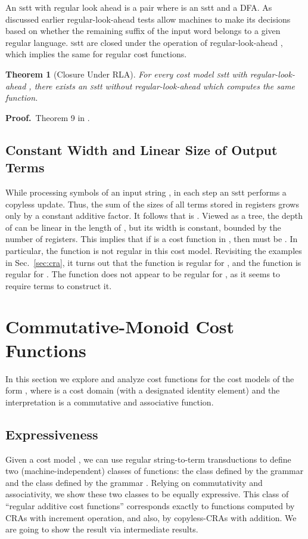 \documentclass[11pt]{article}
\newtheorem{theorem}{Theorem}
\def\Proof{{\bf Proof.}}
\def\qed{{\bf }}
\newcommand{\mypar}[1]{\subsection{#1}}
\def\qed{{\bf }}
\newcommand{\SSTT}{{\sc\textsc sstt}\xspace}
\newcommand{\secref}[1]{Sec.~\ref{sec:#1}\xspace}
\begin{document}
An \SSTT with regular look ahead is a pair  where  is
an \SSTT and  a DFA.  As discussed earlier regular-look-ahead tests
allow machines to make its decisions based on whether the remaining
suffix of the input word belongs to a given regular language.  \SSTT
are closed under the operation of regular-look-ahead
\cite{alur_stt_2011}, which implies the same for regular cost
functions.

\begin{theorem}[Closure Under RLA]\label{thm:stt-rla}
For every cost model \SSTT with regular-look-ahead , there
exists an \SSTT  without regular-look-ahead which computes the
same function.
\end{theorem}
\Proof~Theorem 9 in \cite{alur_stt_2011}.
\qed

\mypar{Constant Width and Linear Size of Output Terms}
While processing symbols of an input string , in each step an \SSTT
performs a copyless update. Thus, the sum of the sizes of all terms
stored in registers grows only by a constant additive factor.  It
follows that  is .  Viewed as a tree, the depth of
 can be linear in the length of , but its width is
constant, bounded by the number of registers.  This implies that if
 is a cost function in , then  must be
. In particular, the function  is not regular in
this cost model.  Revisiting the examples in \secref{cra}, it turns
out that the function  is regular for , and
the function  is regular for .  The
function  does not appear to be
regular for , as it seems to require
 terms to construct it.

\section{Commutative-Monoid Cost Functions}\label{sec:cmcf}
In this section we explore and analyze cost functions for the cost
models of the form , where  is a cost
domain (with a designated identity element) and the interpretation
 is a commutative and associative function.


\mypar{Expressiveness}
Given a cost model , we can use regular
string-to-term transductions to define two (machine-independent)
classes of functions: the class  defined by
the grammar  and the class 
defined by the grammar .  Relying on commutativity and
associativity, we show these two classes to be equally expressive.
This class of ``regular additive cost functions'' corresponds exactly
to functions computed by CRAs with increment operation, and also, by
copyless-CRAs with addition.  We are going to show the result via
intermediate results.
\end{document}
